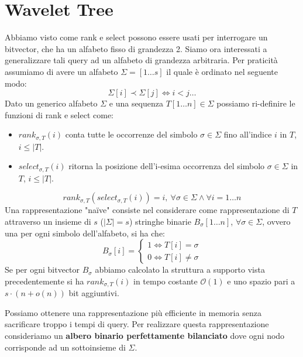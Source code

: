 \section{Wavelet Tree}
Abbiamo visto come rank e select possono essere usati per interrogare un bitvector,
che ha un alfabeto fisso di grandezza 2. Siamo ora interessati a generalizzare
tali query ad un alfabeto di grandezza arbitraria. Per praticità assumiamo di
avere un alfabeto $\Sigma = [1 \dots s]$ il quale è ordinato nel seguente modo:
\begin{equation}
    \Sigma[i] \prec \Sigma[j] \iff i < j \dots
\end{equation}
Dato un generico alfabeto $\Sigma$ e una sequenza $T[1\dots n] \in \Sigma$ possiamo
ri-definire le funzioni di rank e select come:
\begin{itemize}
    \item $rank_{\sigma,T} (i)$ conta tutte le occorrenze del simbolo $\sigma
              \in \Sigma$ fino all'indice $i$ in $T$, $i \leq | T |$.
    \item $select_{\sigma,T} (i)$ ritorna la posizione dell'i-esima occorrenza
          del simbolo $\sigma \in \Sigma$ in $T$, $i \leq | T |$.
\end{itemize}
\begin{equation}
    rank_{\sigma,T} (select_{\sigma,T} (i)) = i, \ \forall \sigma \in \Sigma
    \land \forall i = 1 \dots n
\end{equation}
Una rappresentazione "naïve" consiste nel considerare come rappresentazione di
$T$ attraverso un insieme di $s$ ($| \Sigma | = s$) stringhe binarie $B_\sigma[1
        \dots n]$, $\forall \sigma \in \Sigma$, ovvero una per ogni simbolo
dell'alfabeto, si ha che:
\begin{equation}
    B_\sigma[i] = \begin{cases}
        1 \iff T[i] = \sigma \\
        0 \iff T[i] \neq \sigma
    \end{cases}
\end{equation}
Se per ogni bitvector $B_\sigma$ abbiamo calcolato la struttura a supporto vista
precedentemente si ha $rank_{\sigma,T} (i)$ in tempo costante $\mathcal{O}(1)$ e
uno spazio pari a $s \cdot (n + o(n))$ bit aggiuntivi.

Possiamo ottenere una rappresentazione più efficiente in memoria senza sacrificare
troppo i tempi di query. Per realizzare questa rappresentazione consideriamo un
\textbf{albero binario perfettamente bilanciato} dove ogni nodo corrisponde ad un
sottoinsieme di $\Sigma$.

